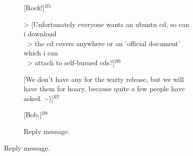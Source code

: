\begin{figure}
\begin{minipage}{.58\textwidth}
{{\begin{subfigure}[b]{0.9\textwidth}
[Rock!]$^{R5}$\vspace{0.1cm}

> [Unfortunately everyone wants an ubuntu cd, so can i download \\ \ 
> the cd covers anywhere or an 'official document' which i can \\ \ 
> attach to self-burned cds?]$^{R6}$\vspace{0.1cm}

[We don't have any for the warty release, but we will have them for hoary, %
because quite a few people have asked. :-)]$^{R7}$\vspace{0.1cm}

[Bob.]$^{R8}$ %
                \caption{Reply message.}
                \label{fig:exampleReply}
        \end{subfigure}
}}

\end{minipage}
\end{figure}
